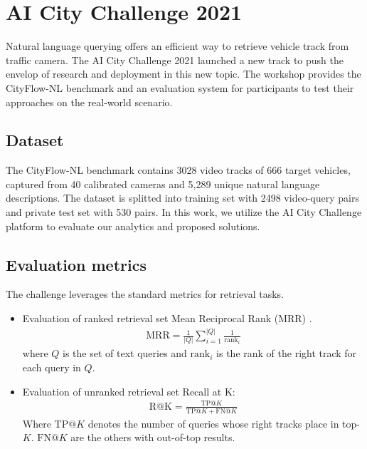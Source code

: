 \section{AI City Challenge 2021}
Natural language querying offers an efficient way to retrieve vehicle track from traffic camera. 
The AI City Challenge 2021 launched a new track to push the envelop of research and deployment in this new topic. 
The workshop provides the CityFlow-NL benchmark and an evaluation system for participants to test their approaches on the real-world scenario.

\subsection{Dataset}
The CityFlow-NL benchmark contains 3028 video tracks of 666 target vehicles, captured from 40 calibrated cameras and 5,289 unique natural language descriptions. 
The dataset is splitted into training set with 2498 video-query pairs and private test set with 530 pairs.
In this work, we utilize the AI City Challenge platform to evaluate our analytics and proposed solutions.

\subsection{Evaluation metrics}
The challenge leverages the standard metrics for retrieval tasks. 
\begin{itemize}
    \item Evaluation of ranked retrieval set Mean Reciprocal Rank (MRR) \cite{voorhees1999trec}.
    \begin{align}
        \mathrm{MRR} = \frac{1}{|Q|}\sum_{i=1}^{|Q|}\frac{1}{\mathrm{rank}_i}
    \end{align}
    where $Q$ is the set of text queries and $\mathrm{rank}_i$ is the rank of the right track for each query in $Q$.
    \item Evaluation of unranked retrieval set Recall at K:
    \begin{align}
        \mathrm{R@K} = \frac{\mathrm{TP}@K}{\mathrm{TP}@K + \mathrm{FN}@K}
    \end{align}
    Where $\mathrm{TP}@K$ denotes the number of queries whose right tracks place in top-$K$. $\mathrm{FN}@K$ are the others with out-of-top results.
\end{itemize}